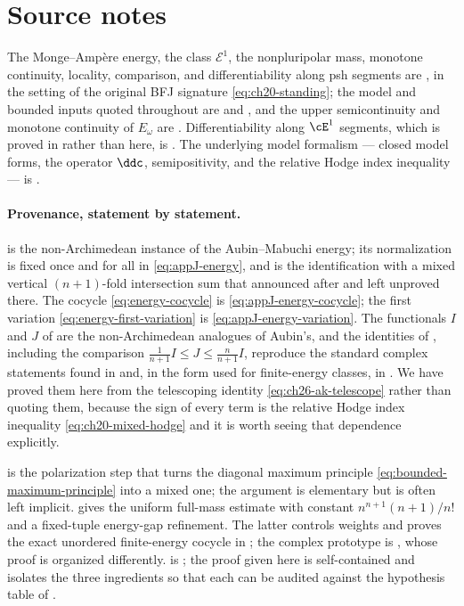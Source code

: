 \section*{Source notes}

The Monge--Amp\`ere energy, the class $\mathcal E^1$, the nonpluripolar
mass, monotone continuity, locality, comparison, and differentiability along
psh segments are \cite[\S6]{BFJ15}, in the setting of the original BFJ
signature \eqref{eq:ch20-standing}; the model and bounded inputs quoted
throughout are \cite[Theorem~3.1]{BFJ15} and
\cite[Theorem~5.1 and Corollaries~5.2--5.3]{BFJ15}, and the upper
semicontinuity and monotone continuity of $E_\omega$ are
\cite[Proposition~6.2]{BFJ15}.  Differentiability along $\cE^1$ segments,
which is proved in  rather than here, is
\cite[Proposition~6.12]{BFJ15}.  The underlying model formalism --- closed
model forms, the operator $\ddc$, semipositivity, and the relative Hodge
index inequality --- is \cite[\S\S2 and 4--5]{BFJ16}.

\paragraph{Provenance, statement by statement.}
 is the non-Archimedean instance of the
Aubin--Mabuchi energy; its normalization is fixed once and for all in
\eqref{eq:appJ-energy}, and  is the
identification with a mixed vertical $(n+1)$-fold intersection sum that
 announced after
 and left unproved there.  The cocycle
\eqref{eq:energy-cocycle} is \eqref{eq:appJ-energy-cocycle}; the first
variation \eqref{eq:energy-first-variation} is
\eqref{eq:appJ-energy-variation}.  The functionals $I$ and $J$ of
 are the non-Archimedean analogues of Aubin's, and the
identities of , including the
comparison $\frac1{n+1}I\leq J\leq\frac n{n+1}I$, reproduce the standard
complex statements found in \cite[\S2]{BEGZ10} and, in the form used for
finite-energy classes, in \cite{GZ07}.  We have proved them here from the
telescoping identity \eqref{eq:ch26-ak-telescope} rather than quoting them,
because the sign of every term is the relative Hodge index inequality
\eqref{eq:ch20-mixed-hodge} and it is worth seeing that dependence
explicitly.

 is the polarization step that turns the
diagonal maximum principle \eqref{eq:bounded-maximum-principle} into a mixed
one; the argument is elementary but is often left implicit.
 gives the uniform full-mass estimate with
constant $n^{n+1}(n+1)/n!$ and a fixed-tuple energy-gap refinement.
The latter controls weights and proves the exact unordered finite-energy
cocycle in ; the complex prototype is
\cite[Proposition~1.6]{BEGZ10}, whose proof is organized differently.
 is \cite[\S6]{BFJ15}; the proof given here is
self-contained and isolates the three ingredients so that each can be
audited against the hypothesis table of .

